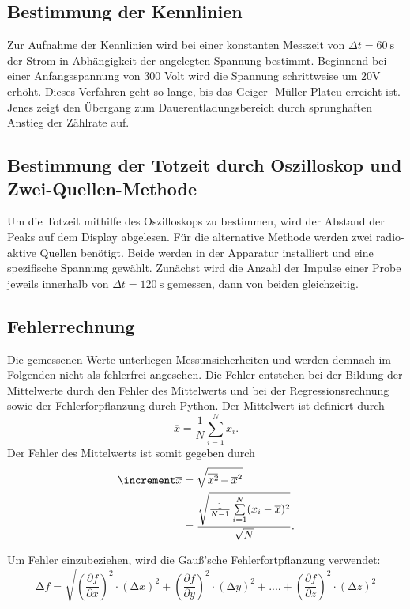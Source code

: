 \subsection{Bestimmung der Kennlinien}
Zur Aufnahme der Kennlinien wird bei einer konstanten Messzeit von $\Delta t 
= \qty{60}{\second}$ der Strom in Abhängigkeit der angelegten Spannung bestimmt. 
Beginnend  bei einer Anfangsspannung von 300 Volt wird die Spannung schrittweise 
um $20 \unit{\volt}$ erhöht. Dieses Verfahren geht so lange, bis das Geiger-
Müller-Plateu erreicht ist. Jenes zeigt den Übergang zum Dauerentladungsbereich 
durch sprunghaften Anstieg der Zählrate auf.

\subsection{Bestimmung der Totzeit durch Oszilloskop und Zwei-Quellen-Methode}
Um die Totzeit mithilfe des Oszilloskops zu bestimmen, wird der Abstand der 
Peaks auf dem Display abgelesen. 
Für die alternative Methode werden zwei radio-aktive Quellen benötigt. Beide 
werden in der Apparatur installiert und eine spezifische Spannung gewählt. 
Zunächst wird die Anzahl der Impulse einer Probe jeweils innerhalb von 
$\Delta t = \qty{120}{\second}$ gemessen, dann von beiden gleichzeitig.

\subsection{Fehlerrechnung}
Die gemessenen Werte unterliegen Messunsicherheiten und werden demnach im
Folgenden nicht als fehlerfrei angesehen. Die Fehler entstehen bei der
Bildung der Mittelwerte durch den Fehler des Mittelwerts und bei der
Regressionsrechnung sowie der Fehlerforpflanzung durch Python.
Der Mittelwert ist definiert durch
\begin{equation}
    \overline{x} = \frac{1}{N} \sum\limits_{i=1}^N x_i.
\end{equation}
\noindent Der Fehler des Mittelwerts ist somit gegeben durch 
\begin{equation}
    \begin{aligned}
        \increment \overline{x} &= \sqrt{\overline{x^2\kern-0.1em} - \overline{x}^2} \\
                            &= \frac{\sqrt{\frac{1}{N-1} \sum\limits_{i=1}^N (x_i - \overline{x})^2}}{\sqrt{N}}.
    \end{aligned}
\end{equation}

Um Fehler einzubeziehen, wird die Gauß'sche Fehlerfortpflanzung verwendet:
\begin{equation}
    \label{eqn:9}
    \increment f = \sqrt{\left(\frac{\partial f}{\partial x}\right)^2 \cdot \left(\increment x\right)^2 + \left(\frac{\partial f}{\partial y}\right)^2 \cdot \left(\increment y\right)^2 + .... + \left(\frac{\partial f}{\partial z}\right)^2 \cdot \left(\increment z\right)^2}
\end{equation}